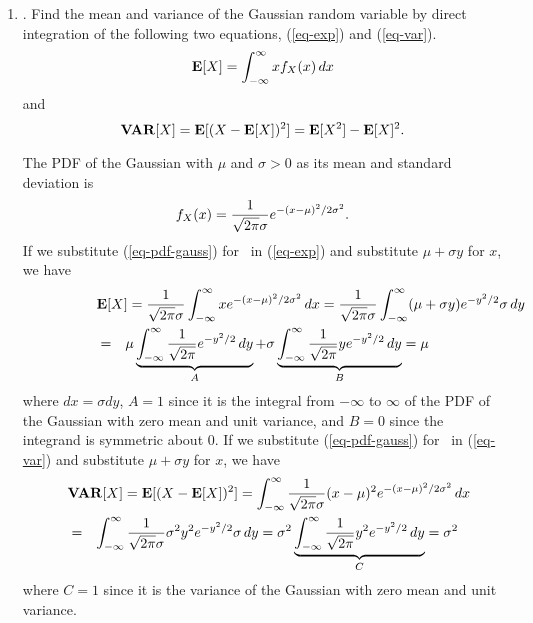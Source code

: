 \begin{enumerate}
	\item {}.
	Find the mean and variance of the Gaussian random variable
	by direct integration of the following two equations, (\ref{eq-exp}) and (\ref{eq-var}).
	\begin{equation}
	\label{eq-exp}
		{\bf E}[X] = \int_{-\infty}^\infty x f_{X}(x) {\, dx}
	\end{equation}
	and
	\begin{equation}
	\label{eq-var}
		{\bf VAR}[X]
		= {\bf E}[(X-{\bf E}[X])^2]
		= {\bf E}[X^2] - {\bf E}[X]^2.
	\end{equation}
	\ifdefined\sol
	\begin{solution}
		The PDF of the Gaussian with $\mu$ and $\sigma>0$ as its mean and standard deviation
		is
		\begin{equation}
		\label{eq-pdf-gauss}
			f_{X}(x) = \frac{1}{\sqrt{2\pi} \sigma} e^{-(x-\mu)^2/2\sigma^2}.
		\end{equation}
		If we substitute (\ref{eq-pdf-gauss}) for \ in (\ref{eq-exp})
		and substitute $\mu + \sigma y$ for $x$,
		we have
		\begin{eqnarray*}
			\lefteqn{
				\Exp{X} = \frac{1}{\sqrt{2\pi} \sigma} \intinftoinf x e^{-(x-\mu)^2/2\sigma^2} \dx
				= \frac{1}{\sqrt{2\pi} \sigma } \intinftoinf (\mu + \sigma y) e^{-y^2/2} \sigma\dy
			}
			\\&=&
			\mu \underbrace{\intinftoinf \frac{1}{\sqrt{2\pi} } e^{-y^2/2} \dy}_A
			+ \sigma \underbrace{\intinftoinf \frac{1}{\sqrt{2\pi} } y e^{-y^2/2} \dy}_B
			= \mu
		\end{eqnarray*}
		where $dx = \sigma dy$, $A=1$ since it is the integral from $-\infty$ to $\infty$ of
		the PDF of the Gaussian with zero mean and unit variance,
		and $B=0$ since the integrand is symmetric about $0$.
		If we substitute (\ref{eq-pdf-gauss}) for \ in (\ref{eq-var})
		and substitute $\mu + \sigma y$ for $x$,
		we have
		\begin{eqnarray*}
			\lefteqn{
			\VAR{X} = \Exp{(X-\Exp{X})^2}
			= \intinftoinf \frac{1}{\sqrt{2\pi} \sigma} (x-\mu)^2 e^{-(x-\mu)^2/2\sigma^2} \dx
			}
			\\&=&
			\intinftoinf \frac{1}{\sqrt{2\pi} \sigma} \sigma ^2 y^2 e^{-y^2/2} \sigma \dy
			= \sigma^ 2 \underbrace{\intinftoinf \frac{1}{\sqrt{2\pi}} y^2 e^{-y^2/2} \dy}_C
			= \sigma^2
		\end{eqnarray*}
		where $C=1$ since it is the variance of the Gaussian with zero mean and unit variance.
	\end{solution}
	\fi


\end{enumerate}

